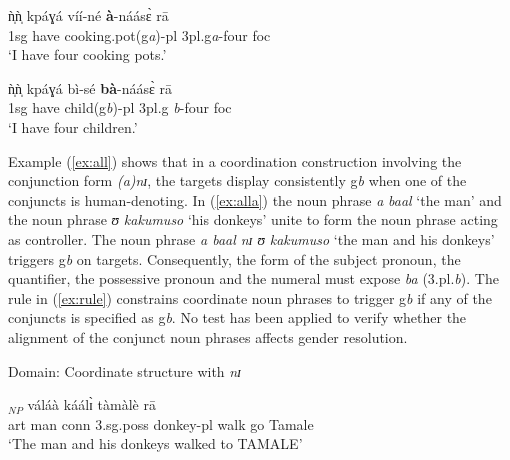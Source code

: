 \begin{exe}
\begin{exe}
\begin{exe}
{\begin{exe}
\begin{exe}
\begin{exe}
\begin{exe}
\begin{exe}
\begin{exe}
\begin{exe}
\begin{xlist}
\begin{exe}
\begin{exe}
\begin{exe}
\begin{exe}
\begin{exe}
\begin{exe}
\begin{exe}
\begin{exe}
\begin{exe}
\begin{exe}
\begin{exe}
\begin{exe}
\begin{exe}
\ex\label{ex:domnumI}

\gll  ǹ̩ǹ̩  kpáɣá  víí-né   \textbf{à}-náásɛ̀ rā \\
        {\sc 1sg}  {have}  {cooking.pot({\sc g}{\it a})-{\sc pl}}   {{\sc
3pl.g}{\it a}-four}  {\sc foc} \\
\glt `I have four cooking pots.' \\



\ex\label{ex:domnumH+}

\gll  ǹ̩ǹ̩   kpáɣá  bì-sé  \textbf{bà}-náásɛ̀  rā  \\
        {\sc 1sg}  {have}  {child({\sc g}{\it b})-{\sc pl}}   {{\sc 3pl.g}{\it
b}-four}  {\sc foc}  \\
\glt `I have four children.' \\



\z 
 \z



Example (\ref{ex:all}) shows that in a coordination construction
involving the conjunction form {\it (a)nɪ},  the targets display
consistently {\sc g}{\it b} when one of the conjuncts is
human-denoting.  In (\ref{ex:alla}) the noun
phrase {\it a} {\it baal} `the man' and the noun phrase
 {\it ʊ  kakumuso} `his donkeys' unite to form the noun
phrase acting as controller.  The noun phrase  {\it a
 baal nɪ ʊ kakumuso} `the man and his
donkeys' triggers {\sc g}{\it b} on targets.  Consequently, the
form of the subject pronoun, the quantifier, the possessive pronoun
and the numeral must expose  {\it ba} ({\sc 3.pl.}{\it b}).
The rule in (\ref{ex:rule}) constrains coordinate noun phrases to
trigger {\sc g}{\it b} if any of the conjuncts is specified as
{\sc g}{\it b}. No test has been applied to verify whether the
alignment of the conjunct noun phrases affects gender
resolution.






\ea\label{ex:all}{\rm Domain: Coordinate structure with {\it nɪ}}\\


\ea\label{ex:alla}

\gll  [à  báál   nɪ̀  ʊ̀ʊ̀  kààkúmò-sō]$_{NP}$  váláà  káálɪ̀  
tàmàlè
rā
\\
      {\sc art} {man} {\sc conn}  {\sc 3.sg.poss} {donkey-{\sc pl}} {walk}  {go}
{Tamale} {\foc} \\
\glt `The man and his donkeys walked to TAMALE' \\


\end{exe}
\end{exe}
\end{exe}
\end{exe}
\end{exe}
\end{exe}
\end{exe}
\end{exe}
\end{exe}
\end{exe}
\end{exe}
\end{exe}
\end{exe}
\end{xlist}
\end{exe}
\end{exe}
\end{exe}
\end{exe}
\end{exe}
\end{exe}
\end{exe}}
\end{exe}
\end{exe}
\end{exe}
